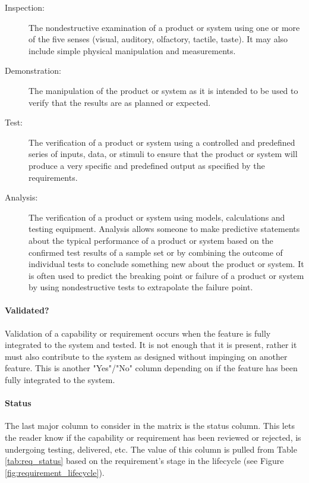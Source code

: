{
\renewcommand{\descriptionlabel}[1]{\hspace{\labelsep}\textbf{#1}}
\begin{description}
    \item[Inspection:] The nondestructive examination of a product or system using one or more of the five senses (visual, auditory, olfactory, tactile, taste). 
    It may also include simple physical manipulation and measurements.
    
    \item[Demonstration:] The manipulation of the product or system as it is intended to be used to verify that the results are as planned or expected.								
    
    \item[Test:] The verification of a product or system using a controlled and predefined series of inputs, data, or stimuli to ensure that the product or system will produce a very specific and predefined output as specified by the requirements.								
    
    \item[Analysis:] The verification of a product or system using models, calculations and testing equipment.
    Analysis allows someone to make predictive statements about the typical performance of a product or system based on the confirmed test results of a sample set or by combining the outcome of individual tests to conclude something new about the product or system.
    It is often used to predict the breaking point or failure of a product or system by using nondestructive tests to extrapolate the failure point.
\end{description}
}

\paragraph*{Validated?} Validation of a capability or requirement occurs when the feature is fully integrated to the system and tested.
It is not enough that it is present, rather it must also contribute to the system as designed without impinging on another feature.
This is another "Yes"/"No" column depending on if the feature has been fully integrated to the system.

\paragraph*{Status} The last major column to consider in the matrix is the status column.
This lets the reader know if the capability or requirement has been reviewed or rejected, is undergoing testing, delivered, etc.
The value of this column is pulled from Table \ref{tab:req_status} based on the requirement's stage in the lifecycle (see Figure \ref{fig:requirement_lifecycle}).

